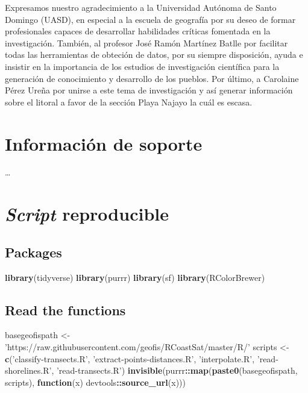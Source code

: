 \documentclass[11pt,]{article}
\newenvironment{Shaded}{\begin{snugshade}}{\end{snugshade}}
\newcommand{\KeywordTok}[1]{\textcolor[rgb]{0.13,0.29,0.53}{\textbf{#1}}}
\newcommand{\StringTok}[1]{\textcolor[rgb]{0.31,0.60,0.02}{#1}}
\newcommand{\ControlFlowTok}[1]{\textcolor[rgb]{0.13,0.29,0.53}{\textbf{#1}}}
\newcommand{\OperatorTok}[1]{\textcolor[rgb]{0.81,0.36,0.00}{\textbf{#1}}}
\newcommand{\NormalTok}[1]{#1}
\begin{document}
Expresamos nuestro agradecimiento a la Universidad Autónoma de Santo
Domingo (UASD), en especial a la escuela de geografía por su deseo de
formar profesionales capaces de desarrollar habilidades críticas
fomentada en la investigación. También, al profesor José Ramón Martínez
Batlle por facilitar todas las herramientas de obteción de datos, por su
siempre disposición, ayuda e insistir en la importancia de los estudios
de investigación científica para la generación de conocimiento y
desarrollo de los pueblos. Por último, a Carolaine Pérez Ureña por
unirse a este tema de investigación y así generar información sobre el
litoral a favor de la sección Playa Najayo la cuál es escasa.

\section{Información de soporte}\label{informaciuxf3n-de-soporte}

\ldots

\section{\texorpdfstring{\emph{Script}
reproducible}{Script reproducible}}\label{script-reproducible}

\subsection{Packages}\label{packages}

\begin{Shaded}
\begin{Highlighting}[]
\KeywordTok{library}\NormalTok{(tidyverse)}
\KeywordTok{library}\NormalTok{(purrr)}
\KeywordTok{library}\NormalTok{(sf)}
\KeywordTok{library}\NormalTok{(RColorBrewer)}
\end{Highlighting}
\end{Shaded}

\subsection{Read the functions}\label{read-the-functions}

\begin{Shaded}
\begin{Highlighting}[]
\NormalTok{basegeofispath <-}\StringTok{ 'https://raw.githubusercontent.com/geofis/RCoastSat/master/R/'}
\NormalTok{scripts <-}\StringTok{ }\KeywordTok{c}\NormalTok{(}\StringTok{'classify-transects.R'}\NormalTok{, }\StringTok{'extract-points-distances.R'}\NormalTok{,}
             \StringTok{'interpolate.R'}\NormalTok{, }\StringTok{'read-shorelines.R'}\NormalTok{, }\StringTok{'read-transects.R'}\NormalTok{)}
\KeywordTok{invisible}\NormalTok{(purrr}\OperatorTok{::}\KeywordTok{map}\NormalTok{(}\KeywordTok{paste0}\NormalTok{(basegeofispath, scripts), }\ControlFlowTok{function}\NormalTok{(x) devtools}\OperatorTok{::}\KeywordTok{source_url}\NormalTok{(x)))}
\end{Highlighting}
\end{Shaded}
\end{document}
